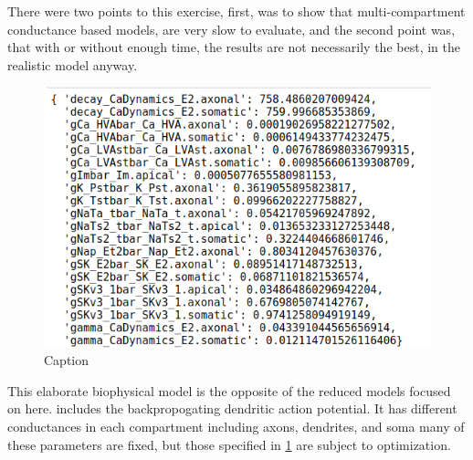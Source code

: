 There were two points to this exercise, first, was to show that multi-compartment conductance based models, are very slow to evaluate, and the second point was, that with or without enough time, the results are not necessarily the best, in the realistic model anyway.

\begin{figure}
    \centering
    \includegraphics{figures/parameters_opt_l5pc.png}
    \caption{Caption}
    \label{fig:parameters}
\end{figure}

This elaborate biophysical model is the opposite of the reduced models focused on here.  includes the backpropogating dendritic action potential. It has different conductances in each compartment including axons, dendrites, and soma many of these parameters are fixed, but those specified in \ref{fig:parameters} are subject to optimization.


